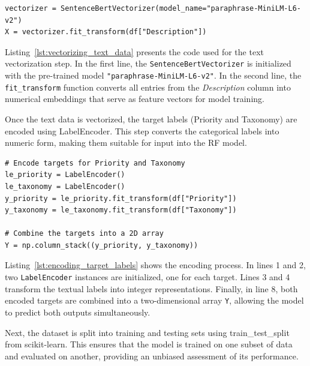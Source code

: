 \vspace{0.2cm}
\noindent
\begin{minipage}{\linewidth}
\begin{verbatim}
vectorizer = SentenceBertVectorizer(model_name="paraphrase-MiniLM-L6-v2")
X = vectorizer.fit_transform(df["Description"])
\end{verbatim}
\label{lst:vectorizing_text_data}
\end{minipage}
\vspace{0.1cm}

Listing~\ref{lst:vectorizing_text_data} presents the code used for the text vectorization step. 
In the first line, the \texttt{SentenceBertVectorizer} is initialized with the pre-trained model \texttt{"paraphrase-MiniLM-L6-v2"}. 
In the second line, the \texttt{fit\_transform} function converts all entries from the \textit{Description} column into numerical embeddings that serve as feature vectors for model training.

Once the text data is vectorized, the target labels (Priority and Taxonomy) are encoded using LabelEncoder. 
This step converts the categorical labels into numeric form, making them suitable for input into the RF model.

\vspace{0.2cm}
\noindent
\begin{minipage}{\linewidth}
\begin{verbatim}
# Encode targets for Priority and Taxonomy
le_priority = LabelEncoder()
le_taxonomy = LabelEncoder()
y_priority = le_priority.fit_transform(df["Priority"])
y_taxonomy = le_taxonomy.fit_transform(df["Taxonomy"])

# Combine the targets into a 2D array
Y = np.column_stack((y_priority, y_taxonomy))
\end{verbatim}
\label{lst:encoding_target_labels}
\end{minipage}
\vspace{0.1cm}

Listing~\ref{lst:encoding_target_labels} shows the encoding process. 
In lines 1 and 2, two \texttt{LabelEncoder} instances are initialized, one for each target. 
Lines 3 and 4 transform the textual labels into integer representations. 
Finally, in line 8, both encoded targets are combined into a two-dimensional array \texttt{Y}, allowing the model to predict both outputs simultaneously.

Next, the dataset is split into training and testing sets using train\_test\_split from scikit-learn. 
This ensures that the model is trained on one subset of data and evaluated on another, providing an unbiased assessment of its performance.

